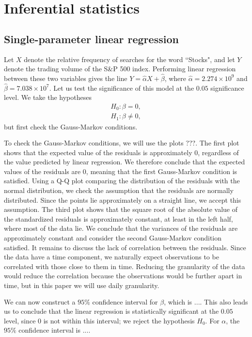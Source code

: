 \documentclass[../main.tex]{subfiles}
\begin{document}
\newpage
\section{Inferential statistics}

\subsection{Single-parameter linear regression}
Let $X$ denote the relative frequency of searches for the word ``Stocks", and let $Y$ denote the trading volume of the S\&P 500 index.
Performing linear regression between these two variables gives the line $Y = \hat{\alpha} X + \hat{\beta}$, where $\hat{\alpha} = 2.274 \times 10^9$ and $\hat{\beta} = 7.038 \times 10^7$.
Let us test the significance of this model at the $0.05$ significance level. We take the hypotheses
\begin{align*}
H_0: \beta = 0, \\
H_1: \beta \ne 0,
\end{align*}
but first check the Gauss-Markov conditions.

To check the Gauss-Markov conditions, we will use the plots ???.
The first plot shows that the expected value of the residuals is approximately $0$, regardless of the value predicted by linear regression. We therefore conclude that the expected values of the residuals are $0$, meaning that the first Gauss-Markov condition is satisfied.
Using a Q-Q plot comparing the distribution of the residuals with the normal distribution, we check the assumption that the residuals are normally distributed. Since the points lie approximately on a straight line, we accept this assumption.
The third plot shows that the square root of the absolute value of the standardized residuals is approximately constant, at least in the left half, where most of the data lie. We conclude that the variances of the residuals are approximately constant and consider the second Gauss-Markov condition satisfied.
It remains to discuss the lack of correlation between the residuals. Since the data have a time component, we naturally expect observations to be correlated with those close to them in time. Reducing the granularity of the data would reduce the correlation because the observations would be further apart in time, but in this paper we will use daily granularity.

We can now construct a $95\%$ confidence interval for $\beta$, which is $...$. This also leads us to conclude that the linear regression is statistically significant at the $0.05$ level, since $0$ is not within this interval; we reject the hypothesis $H_0$.
For $\alpha$, the $95\%$ confidence interval is $...$.
\end{document}
